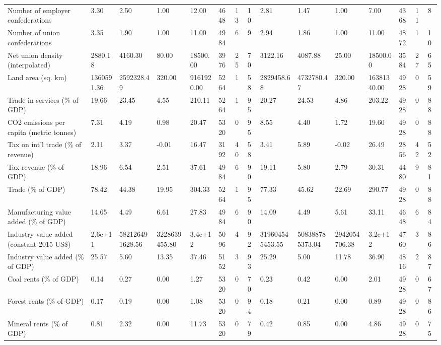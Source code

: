 \begin{longtable}{lllllllllllllll}
\addlinespace
Number of employer confederations & 3.30 & 2.50 & 1.00 & 12.00 & 4648 & 13 & 10 & 2.81 & 1.47 & 1.00 & 7.00 & 4368 & 11 & 8\\
Number of union confederations & 3.35 & 1.90 & 1.00 & 11.00 & 4984 & 6 & 9 & 2.94 & 1.86 & 1.00 & 11.00 & 4872 & 1 & 10\\
Net union density (interpolated) & 2880.18 & 4160.30 & 80.00 & 18500.00 & 3976 & 25 & 70 & 3122.16 & 4087.88 & 25.00 & 18500.00 & 3584 & 27 & 65\\
Land area (sq. km) & 1360591.36 & 2592328.49 & 320.00 & 9161920.00 & 5264 & 1 & 58 & 2829458.68 & 4732780.47 & 320.00 & 16381340.00 & 4928 & 0 & 59\\
Trade in services (\% of GDP) & 19.66 & 23.45 & 4.55 & 210.11 & 5264 & 1 & 95 & 20.27 & 24.53 & 4.86 & 203.22 & 4928 & 0 & 88\\
\addlinespace
CO2 emissions per capita (metric tonnes) & 7.31 & 4.19 & 0.98 & 20.47 & 5320 & 0 & 95 & 8.55 & 4.40 & 1.72 & 19.60 & 4928 & 0 & 88\\
Tax on int'l trade (\% of revenue) & 2.11 & 3.37 & -0.01 & 16.47 & 3192 & 40 & 58 & 3.41 & 5.89 & -0.02 & 26.49 & 2856 & 42 & 52\\
Tax revenue (\% of GDP) & 18.96 & 6.54 & 2.51 & 37.61 & 4984 & 6 & 90 & 19.11 & 5.80 & 2.79 & 30.31 & 4480 & 9 & 81\\
Trade (\% of GDP) & 78.42 & 44.38 & 19.95 & 304.33 & 5264 & 1 & 95 & 77.33 & 45.62 & 22.69 & 290.77 & 4928 & 0 & 88\\
Manufacturing value added (\% of GDP) & 14.65 & 4.49 & 6.61 & 27.83 & 4984 & 6 & 90 & 14.09 & 4.49 & 5.61 & 33.11 & 4648 & 6 & 84\\
\addlinespace
Industry value added (constant 2015 US\$) & 2.6e+11 & 582126491628.56 & 3228639455.80 & 3.4e+12 & 5096 & 4 & 92 & 319604545453.55 & 508388785373.04 & 2942054706.38 & 3.2e+12 & 4760 & 3 & 86\\
Industry value added (\% of GDP) & 25.57 & 5.60 & 13.35 & 37.46 & 5152 & 3 & 93 & 25.29 & 5.00 & 11.78 & 36.90 & 4816 & 2 & 87\\
Coal rents (\% of GDP) & 0.14 & 0.27 & 0.00 & 1.27 & 5320 & 0 & 70 & 0.23 & 0.42 & 0.00 & 2.01 & 4928 & 0 & 67\\
Forest rents (\% of GDP) & 0.17 & 0.19 & 0.00 & 1.08 & 5320 & 0 & 94 & 0.18 & 0.21 & 0.00 & 0.89 & 4928 & 0 & 86\\
Mineral rents (\% of GDP) & 0.81 & 2.32 & 0.00 & 11.73 & 5320 & 0 & 79 & 0.42 & 0.85 & 0.00 & 4.86 & 4928 & 0 & 75\\

\end{longtable}

